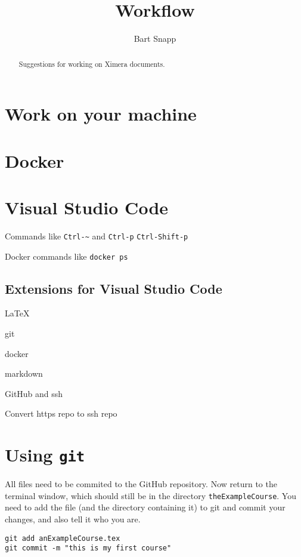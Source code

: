 \documentclass{ximera}
\title{Workflow}
\author{Bart Snapp}
\begin{document}
\begin{abstract}
    Suggestions for working on Ximera documents.
\end{abstract}
\maketitle

\section{Work on your machine}



\section{Docker}



\section{Visual Studio Code}
Commands like \verb!Ctrl-~! and \verb!Ctrl-p! \verb!Ctrl-Shift-p!

Docker commands like
\verb!docker ps!

\subsection{Extensions for Visual Studio Code}

\LaTeX

git

docker

markdown



GitHub and ssh

Convert https repo to ssh repo




\section{Using \texttt{git}}

All files need to be commited to the GitHub repository.
Now return to the terminal window, which should still be in the
directory
\verb!theExampleCourse!. You need to add the file (and the directory
containing
it) to git and commit your changes, and also tell it who you are.
\begin{verbatim}
git add anExampleCourse.tex
git commit -m "this is my first course"
\end{verbatim}
\end{document}
